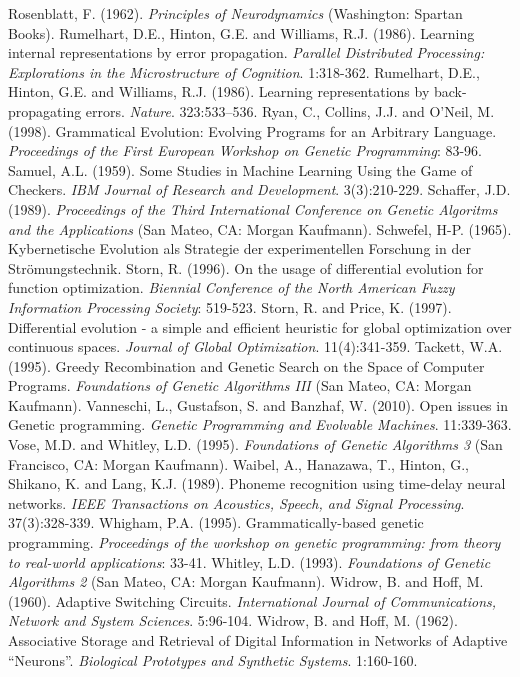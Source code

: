 \documentclass[spanish,a4paper,12pt,twoside]{report}
\begin{document}
\begin{thebibliography}{00}
   Rosenblatt, F. (1962). \emph{Principles of Neurodynamics} (Washington: Spartan Books). 
   Rumelhart, D.E., Hinton, G.E. and Williams, R.J. (1986). Learning internal representations by error propagation. \emph{Parallel Distributed Processing: Explorations in the Microstructure of Cognition}. 1:318-362.
   Rumelhart, D.E., Hinton, G.E. and Williams, R.J. (1986). Learning representations by back-propagating errors. \emph{Nature}. 323:533–536.
   Ryan, C., Collins, J.J. and O'Neil, M. (1998). Grammatical Evolution: Evolving Programs for an Arbitrary Language. \emph{Proceedings of the First European Workshop on Genetic Programming}: 83-96.
   Samuel, A.L. (1959). Some Studies in Machine Learning Using the Game of Checkers. \emph{IBM Journal of Research and Development}. 3(3):210-229.
   Schaffer, J.D. (1989). \emph{Proceedings of the Third International Conference on Genetic Algoritms and the Applications} (San Mateo, CA: Morgan Kaufmann).
   Schwefel, H-P. (1965). Kybernetische Evolution als Strategie der experimentellen Forschung in der Strömungstechnik.
   Storn, R. (1996). On the usage of differential evolution for function optimization. \emph{Biennial Conference of the North American Fuzzy Information Processing Society}: 519-523.
   Storn, R. and Price, K. (1997). Differential evolution - a simple and efficient heuristic for global optimization over continuous spaces. \emph{Journal of Global Optimization}. 11(4):341-359.
   Tackett, W.A. (1995). Greedy Recombination and Genetic Search on the Space of Computer Programs. \emph{Foundations of Genetic Algorithms III} (San Mateo, CA: Morgan Kaufmann).
   Vanneschi, L., Gustafson, S. and Banzhaf, W. (2010). Open issues in Genetic programming. \emph{Genetic Programming and Evolvable Machines}. 11:339-363.
   Vose, M.D. and Whitley, L.D. (1995). \emph{Foundations of Genetic Algorithms 3} (San Francisco, CA: Morgan Kaufmann).
   Waibel, A., Hanazawa, T., Hinton, G., Shikano, K. and Lang, K.J. (1989). Phoneme recognition using time-delay neural networks. \emph{IEEE Transactions on Acoustics, Speech, and Signal Processing}. 37(3):328-339.
   Whigham, P.A. (1995). Grammatically-based genetic programming. \emph{Proceedings of the workshop on genetic programming: from theory to real-world applications}: 33-41.
   Whitley, L.D. (1993). \emph{Foundations of Genetic Algorithms 2} (San Mateo, CA: Morgan Kaufmann).
   Widrow, B. and Hoff, M. (1960). Adaptive Switching Circuits. \emph{International Journal of Communications, Network and System Sciences}. 5:96-104.
   Widrow, B. and Hoff, M. (1962). Associative Storage and Retrieval of Digital Information in Networks of Adaptive “Neurons”. \emph{Biological Prototypes and Synthetic Systems}. 1:160-160.
  \end{thebibliography}
  
\end{document}
